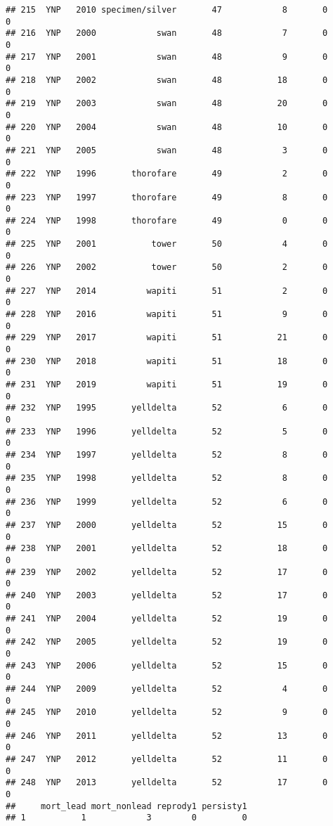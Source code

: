 \documentclass[
]{article}
\begin{document}
\begin{verbatim}
## 215  YNP   2010 specimen/silver       47            8       0        0
## 216  YNP   2000            swan       48            7       0        0
## 217  YNP   2001            swan       48            9       0        0
## 218  YNP   2002            swan       48           18       0        0
## 219  YNP   2003            swan       48           20       0        0
## 220  YNP   2004            swan       48           10       0        0
## 221  YNP   2005            swan       48            3       0        0
## 222  YNP   1996       thorofare       49            2       0        0
## 223  YNP   1997       thorofare       49            8       0        0
## 224  YNP   1998       thorofare       49            0       0        0
## 225  YNP   2001           tower       50            4       0        0
## 226  YNP   2002           tower       50            2       0        0
## 227  YNP   2014          wapiti       51            2       0        0
## 228  YNP   2016          wapiti       51            9       0        0
## 229  YNP   2017          wapiti       51           21       0        0
## 230  YNP   2018          wapiti       51           18       0        0
## 231  YNP   2019          wapiti       51           19       0        0
## 232  YNP   1995       yelldelta       52            6       0        0
## 233  YNP   1996       yelldelta       52            5       0        0
## 234  YNP   1997       yelldelta       52            8       0        0
## 235  YNP   1998       yelldelta       52            8       0        0
## 236  YNP   1999       yelldelta       52            6       0        0
## 237  YNP   2000       yelldelta       52           15       0        0
## 238  YNP   2001       yelldelta       52           18       0        0
## 239  YNP   2002       yelldelta       52           17       0        0
## 240  YNP   2003       yelldelta       52           17       0        0
## 241  YNP   2004       yelldelta       52           19       0        0
## 242  YNP   2005       yelldelta       52           19       0        0
## 243  YNP   2006       yelldelta       52           15       0        0
## 244  YNP   2009       yelldelta       52            4       0        0
## 245  YNP   2010       yelldelta       52            9       0        0
## 246  YNP   2011       yelldelta       52           13       0        0
## 247  YNP   2012       yelldelta       52           11       0        0
## 248  YNP   2013       yelldelta       52           17       0        0
##     mort_lead mort_nonlead reprody1 persisty1
## 1           1            3        0         0

\end{verbatim}
\end{document}
